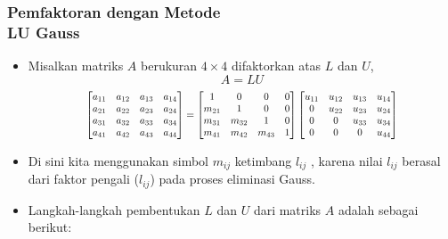 \documentclass[pdflatex,compress,mathserif]{beamer}
\newcommand*{\Scale}[2][4]{\scalebox{#1}{$#2$}}%
\begin{document}
\begin{frame}
	\frametitle{Pemfaktoran dengan Metode\\LU Gauss}
	\begin{itemize}
		\item Misalkan matriks $ A $ berukuran $ 4 \times 4 $ difaktorkan atas $ L $ dan $ U $,
		\[A = LU\]
		\[\Scale[0.8]{
			\begin{bmatrix}
				a_{11} & a_{12} & a_{13} & a_{14} \\
				a_{21} & a_{22} & a_{23} & a_{24} \\
				a_{31} & a_{32} & a_{33} & a_{34} \\
				a_{41} & a_{42} & a_{43} & a_{44} \\
			\end{bmatrix}
			=
			\begin{bmatrix}
			1 & 0 & 0 & 0 \\
			m_{21} & 1 & 0 & 0 \\
			m_{31} & m_{32} & 1 & 0 \\
			m_{41} & m_{42} & m_{43} & 1 \\
			\end{bmatrix}
			\begin{bmatrix}
			u_{11} & u_{12} & u_{13} & u_{14} \\
			0 & u_{22} & u_{23} & u_{24} \\
			0 & 0 & u_{33} & u_{34} \\
			0 & 0 & 0 & u_{44} \\
			\end{bmatrix}
		}\]
		\item Di sini kita menggunakan simbol $ m_{ij} $ ketimbang $ l_{ij} $ , karena nilai $ l_{ij} $ berasal dari faktor pengali ($ l_{ij} $) pada proses eliminasi Gauss.
		\item Langkah-langkah pembentukan $ L $ dan $ U $ dari matriks $ A $ adalah sebagai berikut:
	\end{itemize}
\end{frame}
\end{document}
